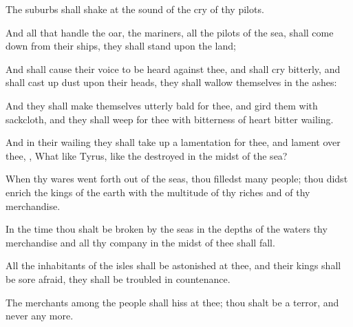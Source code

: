 {The
suburbs shall
shake at the
sound of the
cry of thy
pilots.

And all that
handle the
oar, the
mariners,
{} all the
pilots of the
sea, shall come
down from their
ships, they shall
stand upon the
land;

And shall cause their
voice to be
heard against thee, and shall
cry
bitterly, and shall cast
up
dust upon their
heads, they shall
wallow themselves in the
ashes:

And they shall make themselves
utterly
bald for thee, and
gird them with
sackcloth, and they shall
weep for thee with
bitterness of
heart
{}
bitter
wailing.

And in their
wailing they shall take
up a
lamentation for thee, and
lament over thee,
{}, What
{} like
Tyrus, like the
destroyed in the
midst of the
sea?

When thy
wares went
forth out of the
seas, thou
filledst
many
people; thou didst
enrich the
kings of the
earth with the
multitude of thy
riches and of thy
merchandise.

In the
time
{} thou shalt be
broken by the
seas in the
depths of the
waters thy
merchandise and all thy
company in the
midst of thee shall
fall.

All the
inhabitants of the
isles shall be
astonished at thee, and their
kings shall be
sore
afraid, they shall be
troubled in
{}
countenance.

The
merchants among the
people shall
hiss at thee; thou shalt be a
terror, and never
{} any
more.




\par }
